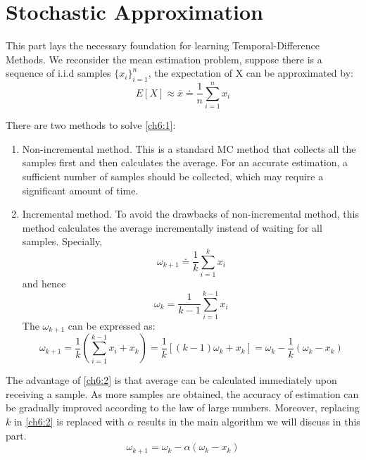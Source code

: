 \part{Stochastic Approximation} This part lays the necessary foundation for learning Temporal-Difference Methods. We
reconsider the mean estimation problem, suppose there is a sequence of i.i.d samples $\{x_{i}\}_{i=1}^{n}$, the
expectation of X can be approximated by:
\begin{equation}
  \label{ch6:1}
  E[X] \approx \overline{x} \doteq \frac{1}{n}\sum_{i=1}^{n}x_{i}
\end{equation}

There are two methods to solve \ref{ch6:1}:
\begin{enumerate}

  \item
        Non-incremental method. This is a standard MC method that collects all the samples first and then calculates the
        average. For an accurate estimation, a sufficient number of samples should be collected, which may require a
        significant amount of time.
  \item
        Incremental method. To avoid the drawbacks of non-incremental method, this method calculates the average incrementally
        instead of waiting for all samples. Specially,
        \begin{equation*}
          \omega_{k+1} \doteq \frac{1}{k}\sum_{i=1}^{k}x_{i}
        \end{equation*}
        and hence
        \begin{equation*}
          \omega_{k} = \frac{1}{k-1}\sum_{i=1}^{k-1}x_{i}
        \end{equation*}
        The $\omega_{k+1}$ can be expressed as:
        \begin{equation}
          \label{ch6:2}
          \omega_{k+1}=\frac{1}{k}(\sum_{i=1}^{k-1}x_{i}+x_{k}) = \frac{1}{k}\left[(k-1) \omega_{k}+x_{k}\right]=
          \omega_{k}-\frac{1}{k}(\omega_{k}-x_{k})
        \end{equation}

\end{enumerate}
The advantage of \ref{ch6:2} is that average can be calculated immediately upon receiving a sample. As more samples are
obtained, the accuracy of estimation can be gradually improved according to the law of large numbers. Moreover,
replacing $k$ in \ref{ch6:2} is replaced with $\alpha$ results in the main algorithm we will discuss in this part.
\begin{equation}
  \label{ch6:3}
  \omega_{k+1}=\omega_{k}-\alpha(\omega_{k}-x_{k})
\end{equation}

